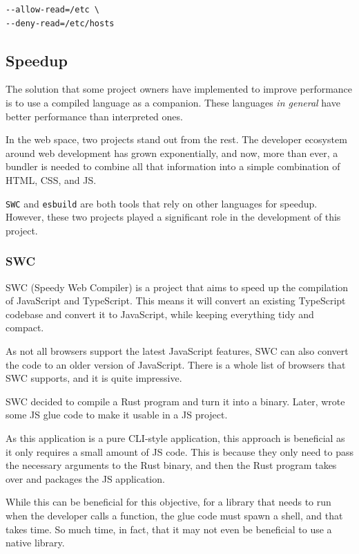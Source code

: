 \documentclass[10pt,journal,compsoc]{IEEEtran}
\begin{document}
\begin{lstlisting}
--allow-read=/etc \
--deny-read=/etc/hosts
    \end{lstlisting}

\subsection{Speedup}

The solution that some project owners have implemented to improve performance is to use a compiled language as a companion. These languages \textit{in general} have better performance than interpreted ones.

In the web space, two projects stand out from the rest. The developer ecosystem around web development has grown exponentially, and now, more than ever, a bundler \cite{Bundler} is needed to combine all that information into a simple combination of HTML, CSS, and JS.

\verb|SWC| and \verb|esbuild| are both tools that rely on other languages for speedup. However, these two projects played a significant role in the development of this project.

\subsubsection{SWC}

SWC (Speedy Web Compiler) is a project that aims to speed up the compilation of JavaScript and TypeScript. This means it will convert an existing TypeScript codebase and convert it to JavaScript, while keeping everything tidy and compact.

As not all browsers support the latest JavaScript features, SWC can also convert the code to an older version of JavaScript. There is a whole list of browsers that SWC supports, and it is quite impressive.

SWC decided to compile a Rust program and turn it into a binary. Later, wrote some JS glue code to make it usable in a JS project.

As this application is a pure CLI-style application, this approach is beneficial as it only requires a small amount of JS code. This is because they only need to pass the necessary arguments to the Rust binary, and then the Rust program takes over and packages the JS application.

While this can be beneficial for this objective, for a library that needs to run when the developer calls a function, the glue code must spawn a shell, and that takes time. So much time, in fact, that it may not even be beneficial to use a native library.
\end{document}
